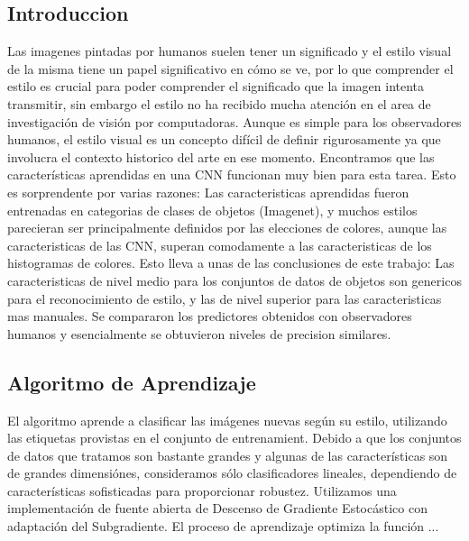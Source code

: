 \documentclass[a4paper,12pt,spanish]{book}
\begin{document}
    \subsection{Introduccion}
      Las imagenes pintadas por humanos suelen tener un significado y el estilo visual de la misma tiene un papel significativo en cómo se ve, por lo que comprender
      el estilo es crucial para poder comprender el significado que la imagen intenta transmitir, sin embargo el estilo no ha recibido  mucha atención en el area de investigación de visión por computadoras. 
      Aunque es simple para los observadores humanos, el estilo visual es un concepto difícil de definir rigurosamente ya que involucra el contexto historico del arte en ese momento.
      Encontramos que las características aprendidas en una CNN funcionan muy bien para esta tarea. Esto es sorprendente por varias razones: Las caracteristicas aprendidas
      fueron entrenadas en categorias de clases de objetos (Imagenet), y muchos estilos parecieran ser principalmente definidos por las elecciones de colores, aunque
      las caracteristicas de las CNN, superan comodamente a las caracteristicas de los histogramas de colores. Esto lleva a unas de las conclusiones de este trabajo:
      Las caracteristicas de nivel medio para los conjuntos de datos de objetos son genericos para el reconocimiento de estilo, y las de nivel superior para las caracteristicas
      mas manuales.
      Se compararon los predictores obtenidos con observadores humanos y esencialmente se obtuvieron niveles de precision similares.
    \subsection{Algoritmo de Aprendizaje}
      El algoritmo aprende a clasificar las imágenes nuevas según su estilo, utilizando las etiquetas provistas en el conjunto de entrenamient.
      Debido a que los conjuntos de datos que tratamos son bastante grandes y algunas de las características son de grandes dimensiónes, consideramos sólo clasificadores lineales, 
      dependiendo de características sofisticadas para proporcionar robustez. Utilizamos una implementación de fuente abierta de Descenso de Gradiente Estocástico con adaptación
      del Subgradiente. El proceso de aprendizaje optimiza la función ...
\end{document}
